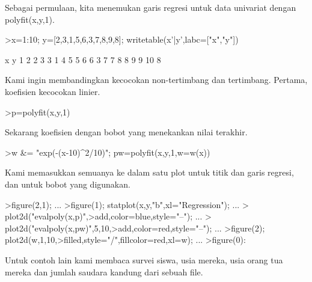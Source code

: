 \documentclass[a4paper,10pt]{article}
\begin{document}
\begin{eulernotebook}
\begin{eulercomment}
Sebagai permulaan, kita menemukan garis regresi untuk data univariat
dengan polyfit(x,y,1).
\end{eulercomment}
\begin{eulerprompt}
>x=1:10; y=[2,3,1,5,6,3,7,8,9,8]; writetable(x'|y',labc=["x","y"])
\end{eulerprompt}
\begin{euleroutput}
           x         y
           1         2
           2         3
           3         1
           4         5
           5         6
           6         3
           7         7
           8         8
           9         9
          10         8
\end{euleroutput}
\begin{eulercomment}
Kami ingin membandingkan kecocokan non-tertimbang dan tertimbang.
Pertama, koefisien kecocokan linier.
\end{eulercomment}
\begin{eulerprompt}
>p=polyfit(x,y,1)
\end{eulerprompt}
\begin{euleroutput}
  [0.733333,  0.812121]
\end{euleroutput}
\begin{eulercomment}
Sekarang koefisien dengan bobot yang menekankan nilai terakhir.
\end{eulercomment}
\begin{eulerprompt}
>w &= "exp(-(x-10)^2/10)"; pw=polyfit(x,y,1,w=w(x))
\end{eulerprompt}
\begin{euleroutput}
  [4.71566,  0.38319]
\end{euleroutput}
\begin{eulercomment}
Kami memasukkan semuanya ke dalam satu plot untuk titik dan garis
regresi, dan untuk bobot yang digunakan.
\end{eulercomment}
\begin{eulerprompt}
>figure(2,1);  ...
>figure(1); statplot(x,y,"b",xl="Regression"); ...
>  plot2d("evalpoly(x,p)",>add,color=blue,style="--"); ...
>  plot2d("evalpoly(x,pw)",5,10,>add,color=red,style="--"); ...
>figure(2); plot2d(w,1,10,>filled,style="/",fillcolor=red,xl=w); ...
>figure(0):
\end{eulerprompt}
\begin{eulercomment}
Untuk contoh lain kami membaca survei siswa, usia mereka, usia orang
tua mereka dan jumlah saudara kandung dari sebuah file.


\end{eulercomment}
\end{eulernotebook}
\end{document}
